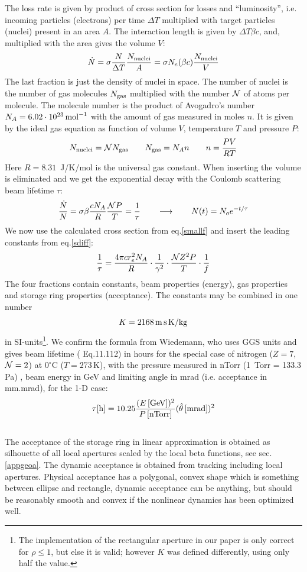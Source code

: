 \documentclass[12pt]{article}
\newcommand\beq{\begin{equation}}
\newcommand\eeq{\end{equation}}
\begin{document}
The loss rate is given by product of cross section for losses and ``luminosity'', i.e. incoming particles (electrons) per time $\Delta T$ multiplied with target particles (nuclei) present in an area $A$. The interaction length is given by $\Delta T \beta c$, and, multiplied with the area gives the volume $V$:
\beq\label{lossrate}
\dot N = \sigma \frac{N}{\Delta T}\frac{N_{\rm nuclei}}{A} = \sigma N_e  (\beta c) \frac{N_{\rm nuclei}}{V}
\eeq
The last fraction is just the density of nuclei in space.
The number of nuclei is the number of gas molecules $N_{\rm gas}$ multiplied with the number $\cal N$ of atoms per molecule. The molecule number is the product of Avogadro's number $N_A=6.02\cdot 10^{23}\,{\rm mol}^{-1}$ with the amount of gas measured in moles $n$. It is given by the ideal gas equation as function of volume $V$, temperature $T$ and pressure $P$:
\beq
N_{\rm nuclei} = {\cal N} N_{\rm gas}\qquad N_{\rm gas}=N_A n\qquad n = \frac{P V}{R T}
\eeq
Here $R=8.31$~J/K/mol is the universal gas constant. When inserting the volume is eliminated and we get the exponential decay with the Coulomb scattering beam lifetime $\tau$:
\beq
\frac{\dot N}{N} = \sigma \beta \frac{c N_A}{R}  \frac{{\cal N}P}{T} = \frac{1}{\tau}\qquad\longrightarrow\qquad N(t)=N_{o} e^{-t/\tau}
\eeq
We now use the calculated cross section from eq.\ref{smallf} and insert the leading constants from eq.\ref{sdiff}:
\beq\label{tauel}
\frac{1}{\tau} = \frac{4\pi c r_e^2 N_A}{R} \cdot \frac{1}{\gamma^2} \cdot \frac{ {\cal N} Z^2 P}{T} \cdot \frac{1}{f}
\eeq
The four fractions contain constants, beam properties (energy), gas properties and storage ring properties (acceptance). The constants may be combined in one number
\beq\label{kconst}
K = 2168\,{\rm m }\,{\rm s }\,{\rm K }/{\rm kg}
\eeq
in SI-units\footnote{The implementation of the rectangular aperture in our paper \cite{asaa06} is only correct for $\rho\leq 1$, but else it is valid; however $K$ was defined differently, using only half the value.}.
We confirm the formula from Wiedemann, who uses GGS units and gives beam lifetime (\cite{wiedemann} Eq.11.112) in hours for the special case of nitrogen ($Z=7$, ${\cal N}=2$) at $0^{\circ}$C ($T=273$\,K), with the pressure measured in nTorr (1~Torr = 133.3 Pa) , beam energy in GeV and limiting angle in mrad (i.e. acceptance in mm.mrad), for the 1-D case:
\beq
\tau {\rm [h]} = 10.25 \frac{(E\, {\rm [GeV]} )^2}{P\,{\rm [nTorr]}} (\hat\theta\, {\rm [mrad]})^2
\eeq
\\

The acceptance of the storage ring in linear approximation is obtained as silhouette of all local apertures scaled by the local beta functions, see sec.\ref{appgeoa}. The dynamic acceptance is obtained from tracking including local apertures. Physical acceptance has a polygonal, convex shape which is something between ellipse and rectangle, dynamic acceptance can be anything, but should be reasonably smooth and convex if the nonlinear dynamics has been optimized well.
\end{document}
